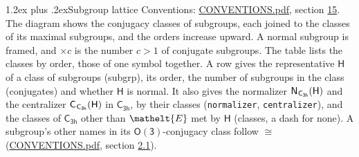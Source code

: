 \documentclass[10pt,a4paper]{article}
\makeatletter
\renewcommand\section{\@startsection{section}{1}{\z@}{-3ex plus -1ex minus -.2ex}%
  {1.2ex plus .2ex}{\normalfont\large\sffamily\bfseries\color{parttitle}}}
\numberwithin{equation}{section}
\newcommand{\eltfont}[1]{{\let\sigma\eltsigma\mathelt{#1}}}
\newcommand{\grp}[1]{\mathsf{#1}}
\newcommand{\cls}[1]{\eltfont{#1}}
\newcommand{\samecls}{\cong}
\newcommand{\hairsp}{\mkern1mu}
\makeatother
\begin{document}
\section{Subgroup lattice}\label{s:subgroups}
Conventions: \href{../../CONVENTIONS.pdf}{CONVENTIONS.pdf}, section \href{../../CONVENTIONS.pdf\#conv.15}{15}.
The diagram shows the conjugacy classes of subgroups, each joined to the classes of its maximal subgroups, and the orders increase upward. \label{n:index.conjugates.c}A normal subgroup is framed, and ${\times}c$ is the number $c > 1$ of conjugate subgroups. The table lists the classes by order, those of one symbol together. \label{n:group.H}\label{n:head.subgroup}\label{n:head.order}\label{n:head.conjugates}\label{n:head.normal}A row gives the representative $\grp{H}$ of a class of subgroups (subgrp), its order, the number of subgroups in the class (conjugates) and whether $\grp{H}$ is normal. \label{n:group.normalizer}\label{n:group.centralizer}\label{n:head.classes}It also gives the normalizer $\grp{N}_{\hairsp \grp{C_{3h}}}(\grp{H})$ and the centralizer $\grp{C}_{\hairsp \grp{C_{3h}}}(\grp{H})$ in $\grp{C_{3h}}$, by their classes (\texttt{normalizer}, \texttt{centralizer}), and the classes of $\grp{C_{3h}}$ other than $\cls{E}$ met by $\grp{H}$ (classes, a dash for none). A subgroup's other names in its \href{O3.pdf}{$\grp{O(3)}$}-conjugacy class follow $\samecls$ (\href{../../CONVENTIONS.pdf}{CONVENTIONS.pdf}, section \href{../../CONVENTIONS.pdf\#conv.2.1}{2.1}).
\begin{center}
\end{center}
\end{document}
